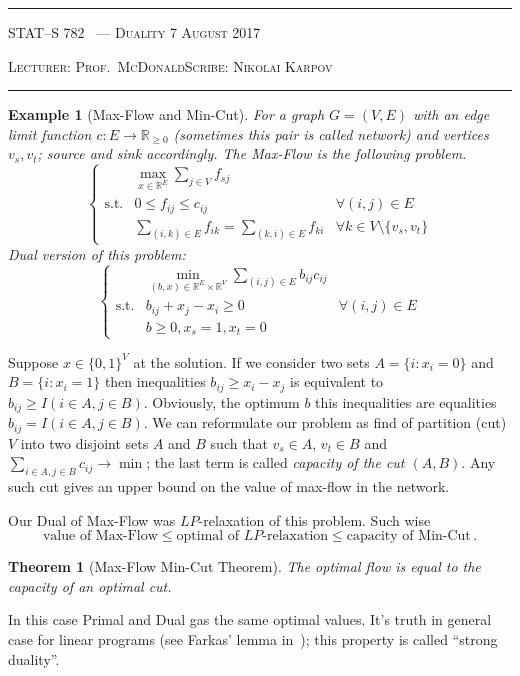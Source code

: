 \documentclass[10pt]{article}
\newcounter{lecnum}
\newtheorem{theorem}{Theorem}[lecnum]
\newtheorem{example}[ex]{Example}
\newcommand{\R}{\mathbb{R}}
\newcommand{\lecturer}{Prof.\ McDonald}
\newcommand{\scribe}{Nikolai Karpov}
\newcommand{\chtitle}{Duality}
\newcommand{\lecdate}{7 August 2017}
\begin{document}
\rule{6.5in}{1pt}

\textsc{STAT--S 782
        \hfill \thelecnum\ --- \chtitle
        \hfill \lecdate}

\textsc{Lecturer: \lecturer \hfill Scribe: \scribe}
\rule{6.5in}{1pt}

\begin{example}[Max-Flow and Min-Cut]
	For a graph $G = (V, E)$ with an edge limit function $c : E \rightarrow \R_{\geq 0}$ (sometimes this pair is called network) and vertices $v_s, v_t$; source and sink
	accordingly. The Max-Flow is the following problem.
	\[\left\{
	\begin{array}{lll}
	& \max\limits_{x \in \R^E} {\sum\limits_{j \in V}f_{sj}} \\
	\text{s.t.} &  0 \leq f_{ij} \leq c_{ij} & \forall (i, j) \in E \\
	& \sum\limits_{(i, k) \in E} f_{ik} = \sum\limits_{(k, i) \in E} f_{ki} & \forall k \in V \setminus \{v_s, v_t\}
	\end{array}
	\right.
	\]
	Dual version of this problem:
	\[
	\left\{
	\begin{array}{lll}
	&\min\limits_{(b, x) \in \R^E\times \R^V}\sum\limits_{(i, j) \in E}b_{ij}c_{ij} \\
	\text{s.t.} & b_{ij}+x_j-x_i \geq 0 & \forall (i, j) \in E \\
	& b \geq 0, x_s = 1, x_t = 0
	\end{array}
	\right.
	\]
\end{example}
	Suppose $x \in \{0, 1\}^V$ at the solution. If we consider two sets
	$A = \{i : x_i = 0\}$ and $B = \{i : x_i = 1\}$ then inequalities
	$b_{ij} \geq x_i - x_j$ is equivalent to $b_{ij} \geq I(i \in A, j \in B)$. Obviously, the optimum $b$ this inequalities are equalities $b_{ij} = I(i \in A, j \in B)$. We can reformulate our problem as find of partition (cut) $V$ into two disjoint sets $A$ and $B$ such that $v_s \in A$, $v_t \in B$ and $\sum\limits_{i \in A, j \in B}c_{ij} \rightarrow \min$; the last term is called \emph{capacity of the cut $(A, B)$}. Any such cut gives an upper bound on the value of max-flow in the network.
	
	Our Dual of Max-Flow was $LP$-relaxation of this problem. Such wise $$\text{value of Max-Flow} \leq \text{optimal of }LP\text{-relaxation} \leq \text{capacity of Min-Cut}\,.$$
	\begin{theorem}[Max-Flow Min-Cut Theorem] The optimal flow is equal to the capacity of an optimal cut.
	\end{theorem}
	In this case Primal and Dual gas the same optimal values. It's truth in general case for linear programs (see Farkas' lemma in~\cite{boyd2004convex}); this property is called ``strong duality''.
\end{document}

